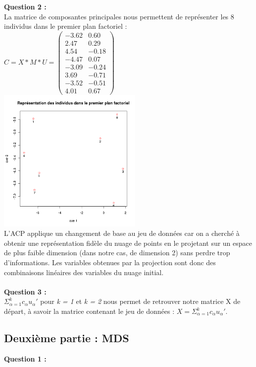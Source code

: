 \documentclass[a4paper, 10pt]{article}
\begin{document}
\textbf{Question 2 :}\\
La matrice de composantes principales nous permettent de représenter les 8 individus dans le premier plan factoriel :\\
$C = X * M * U = \begin{pmatrix} -3.62 & 0.60 \\ 2.47 & 0.29 \\ 4.54 & -0.18 \\ -4.47 & 0.07 \\
-3.09 & -0.24 \\ 3.69 & -0.71 \\ -3.52 & -0.51 \\ 4.01 & 0.67 \end{pmatrix}$\\      
\includegraphics[height = 7cm, width = 7cm]{plots/biplot_exo1_princomp.png}\\
L'ACP applique un changement de base au jeu de données car on a cherché à obtenir une représentation fidèle du nuage de points en
le projetant sur un espace de plus faible dimension (dans notre cas, de dimension 2) sans perdre trop d'informations.
Les variables obtenues par la projection sont donc des combinaisons linéaires des variables du nuage initial.\\ \\
\textbf{Question 3 :}\\
$\varSigma^{k}_{\alpha=1} c_{\alpha}u_{\alpha}'$ pour \textit{k = 1} et \textit{k = 2} nous permet de retrouver notre matrice X de départ,
à savoir la matrice contenant le jeu de données : $X = \varSigma^{k}_{\alpha=1} c_{\alpha}u_{\alpha}'$.

\subsection*{Deuxième partie : MDS}
\textbf{Question 1 :}\\
\end{document}
